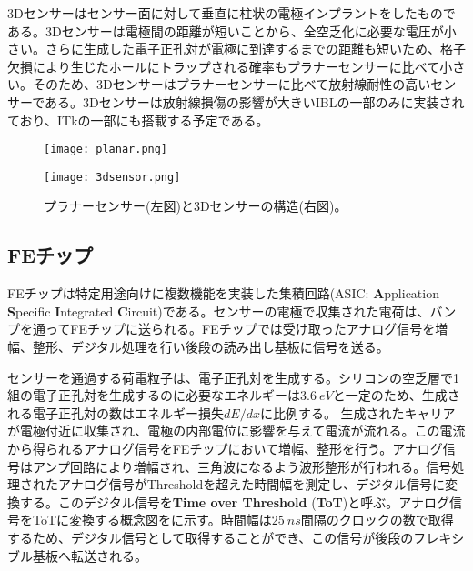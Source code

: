 3Dセンサーはセンサー面に対して垂直に柱状の電極インプラントをしたものである。3Dセンサーは電極間の距離が短いことから、全空乏化に必要な電圧が小さい。さらに生成した電子正孔対が電極に到達するまでの距離も短いため、格子欠損により生じたホールにトラップされる確率もプラナーセンサーに比べて小さい。そのため、3Dセンサーはプラナーセンサーに比べて放射線耐性の高いセンサーである。3Dセンサーは放射線損傷の影響が大きいIBLの一部のみに実装されており、ITkの一部にも搭載する予定である。

\begin{figure}[tbp]
  \begin{minipage}[b]{0.45\linewidth}
    \centering
    \texttt{[image: planar.png]}
  \end{minipage}
  \begin{minipage}[b]{0.45\linewidth}
    \centering
    \texttt{[image: 3dsensor.png]}
  \end{minipage}
  \caption[プラナーセンサーと3Dセンサーの構造]{プラナーセンサー(左図)と3Dセンサーの構造(右図)。}
  \label{fig:3dplanar}
\end{figure}


\subsection{FEチップ}
\label{sec:ASIC}

FEチップは特定用途向けに複数機能を実装した集積回路(ASIC: \textbf{A}pplication \textbf{S}pecific \textbf{I}ntegrated \textbf{C}ircuit)である。センサーの電極で収集された電荷は、バンプを通ってFEチップに送られる。FEチップでは受け取ったアナログ信号を増幅、整形、デジタル処理を行い後段の読み出し基板に信号を送る。


センサーを通過する荷電粒子は、電子正孔対を生成する。シリコンの空乏層で1組の電子正孔対を生成するのに必要なエネルギーは$3.6\ \si{eV}$と一定のため、生成される電子正孔対の数はエネルギー損失$dE/dx$に比例する。
生成されたキャリアが電極付近に収集され、電極の内部電位に影響を与えて電流が流れる。この電流から得られるアナログ信号をFEチップにおいて増幅、整形を行う。アナログ信号はアンプ回路により増幅され、三角波になるよう波形整形が行われる。信号処理されたアナログ信号がThresholdを超えた時間幅を測定し、デジタル信号に変換する。このデジタル信号を\textbf{Time over Threshold} (\textbf{ToT})と呼ぶ。アナログ信号をToTに変換する概念図をに示す。時間幅は$25\ \si{ns}$間隔のクロックの数で取得するため、デジタル信号として取得することができ、この信号が後段のフレキシブル基板へ転送される。

